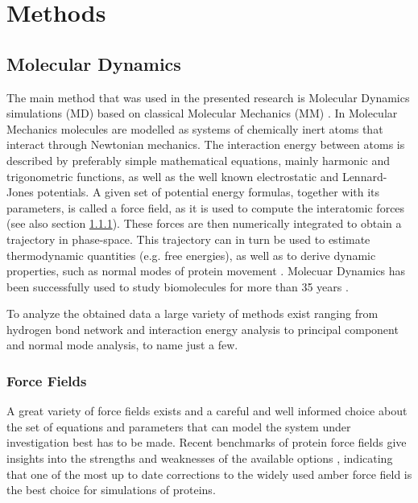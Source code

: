 \documentclass[english, a4paper, 12pt, titlepage, draft]{article}
\begin{document}

\section{Methods}
\subsection{Molecular Dynamics}

The main method that was used in the presented research is Molecular Dynamics simulations (MD) based on classical Molecular Mechanics (MM) \cite{MDintro}.
In Molecular Mechanics molecules are modelled as systems of chemically inert atoms that interact through Newtonian mechanics.
The interaction energy between atoms is described by preferably simple mathematical equations, mainly harmonic and trigonometric functions, as well as the well known electrostatic and Lennard-Jones potentials.
A given set of potential energy formulas, together with its parameters, is called a force field, as it is used to compute the interatomic forces (see also section \ref{sec:forcefields}).
These forces are then numerically integrated to obtain a trajectory in phase-space.
This trajectory can in turn be used to estimate thermodynamic quantities (e.g. free energies), as well as to derive dynamic properties, such as normal modes of protein movement \cite{normalModes}.
Molecuar Dynamics has been successfully used to study biomolecules for more than 35 years \cite{MDbiomolecules}.


To analyze the obtained data a large variety of methods exist ranging from hydrogen bond network and interaction energy analysis to principal component and normal mode analysis, to name just a few.
 
 
\subsubsection{Force Fields}
\label{sec:forcefields}

A great variety of force fields exists and a careful and well informed choice about the set of equations and parameters that can model the system under investigation best has to be made.
Recent benchmarks of protein force fields give insights into the strengths and weaknesses of the available options \cite{proteinFF}, indicating that one of the most up to date corrections to the widely used amber force field \cite{amber99sb-ildn-nmr} is the best choice for simulations of proteins.
 
\end{document}
